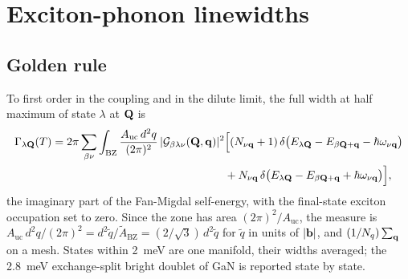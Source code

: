 \section{Exciton-phonon linewidths}
\label{sec:lw}

\subsection{Golden rule}
To first order in the coupling and in the dilute limit, the full width at half
maximum of state $\lambda$ at $\mathbf{Q}$ is
\begin{equation}
\begin{split}
\Gamma_{\lambda\mathbf{Q}}(T)=2\pi\sum_{\beta\nu}\int_{\mathrm{BZ}}\frac{A_{\mathrm{uc}}\,d^2q}{(2\pi)^2}\,
|\mathcal{G}_{\beta\lambda\nu}(\mathbf{Q},\mathbf{q})|^2
&\Bigl[(N_{\nu\mathbf{q}}+1)\,\delta\bigl(E_{\lambda\mathbf{Q}}-E_{\beta\mathbf{Q}+\mathbf{q}}-\hbar\omega_{\nu\mathbf{q}}\bigr)\\
&+N_{\nu\mathbf{q}}\,\delta\bigl(E_{\lambda\mathbf{Q}}-E_{\beta\mathbf{Q}+\mathbf{q}}+\hbar\omega_{\nu\mathbf{q}}\bigr)\Bigr],
\end{split}
\label{eq:fgr}
\end{equation}
the imaginary part of the Fan-Migdal self-energy, with the final-state exciton
occupation set to zero. Since the zone has area $(2\pi)^2/A_{\mathrm{uc}}$, the
measure is $A_{\mathrm{uc}}\,d^2q/(2\pi)^2=d^2\tilde q/\tilde A_{\mathrm{BZ}}=
(2/\sqrt3)\,d^2\tilde q$ for $\tilde q$ in units of $|\mathbf{b}|$, and
$(1/N_q)\sum_{\mathbf{q}}$ on a mesh. States within 2~meV are one manifold, their
widths averaged; the 2.8~meV exchange-split bright doublet of GaN is reported
state by state.

